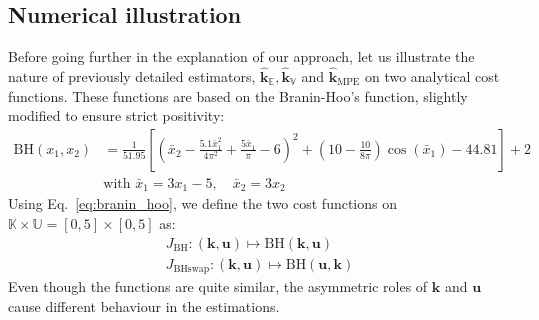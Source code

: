 \documentclass[preprint, review, 1p]{elsarticle}
\newcommand{\Ex}{\mathbb{E}}
\newcommand{\hatkmean}{\hat{\mathbf{k}}_{\Ex}}
\newcommand{\hatkvar}{\hat{\mathbf{k}}_{\mathbb{V}}}
\newcommand{\hatkmpe}{\hat{\mathbf{k}}_{\mathrm{MPE}}}
\newcommand{\Kspace}{\mathbb{K}}
\newcommand{\Uspace}{\mathbb{U}}
\newcommand{\JBH}{J_{\mathrm{BH}}}
\newcommand{\JBHS}{J_{\mathrm{BHswap}}}
\begin{document}
\subsection{Numerical illustration}
\label{ssec:num_illu}
Before going further in the explanation of our approach, let us illustrate the nature of previously detailed estimators, $\hatkmean, \hatkvar$ and $\hatkmpe$ on two analytical cost functions. These functions are based on the Branin-Hoo's function, slightly modified to ensure strict positivity:
\begin{align}
  \label{eq:branin_hoo}
 \mathrm{BH}(x_1,x_2) &= \frac{1}{51.95}\left[\left(\bar{x}_2 - \frac{5.1 \bar{x}_1^2}{4\pi^2} + \frac{5\bar{x}_1}{\pi} -6 \right)^2 + \left(10 - \frac{10}{8\pi}\right)\cos(\bar{x}_1)-44.81\right]+2\\
&\text{with } \bar{x}_1 = 3x_1-5,\quad \bar{x}_2 = 3x_2
\end{align}
%
Using Eq.~\eqref{eq:branin_hoo}, we define the two cost functions on $\Kspace \times \Uspace = [0,5] \times [0,5]$ as:
\begin{align*} \JBH : (\mathbf{k},\mathbf{u}) \mapsto \mathrm{BH}(\mathbf{k},\mathbf{u}) \\
\JBHS : (\mathbf{k},\mathbf{u}) \mapsto \mathrm{BH}(\mathbf{u},\mathbf{k})
\end{align*}
Even though the functions are quite similar, the asymmetric roles of $\mathbf{k}$ and $\mathbf{u}$ cause different behaviour in the estimations.
\end{document}
